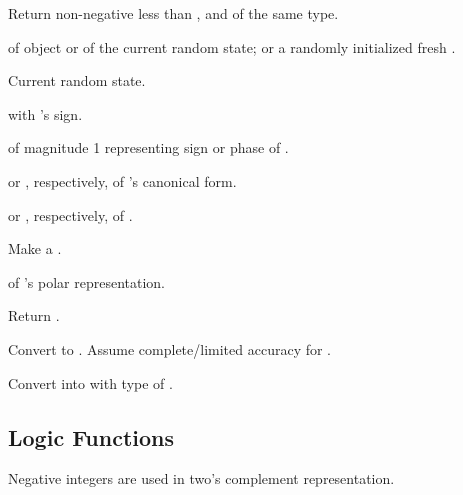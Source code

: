 \begin{LIST}{1cm}
  {
    Return non-negative  less than ,
    and of the same type.
  }

  {
     of  object  or of
    the current random state; or a randomly initialized fresh .
  }

  {
    Current random state.
  }

  {
     with 's sign.
  }

  { of magnitude 1
    representing sign or phase of .
  }

  {
     or , respectively, of
    's canonical form.
  }

  {
     or , respectively, of .
  }

  {
    Make a .
  }

  {
     of 's polar representation.
  }

  {
    Return .
  }

  {
    Convert  to . Assume complete/limited accuracy for .
  }

  {
    Convert  into  with type of .
  }

\end{LIST}


\subsection{Logic Functions}
\label{section:Logic Functions}
Negative integers are used in
two's complement representation.

